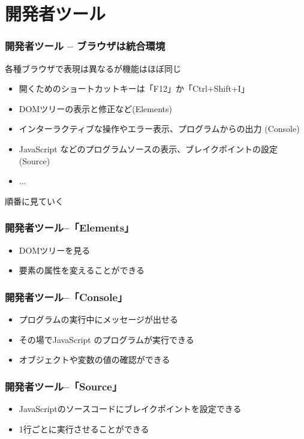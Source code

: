 \section{開発者ツール}
\begin{frame}[containsverbatim]
 \frametitle{開発者ツール -- ブラウザは統合環境}
 各種ブラウザで表現は異なるが機能はほぼ同じ
 \begin{itemize}
  \item 開くためのショートカットキーは「F12」か「Ctrl+Shift+I」
  \item DOMツリーの表示と修正など(Elements)
  \item インターラクティブな操作やエラー表示、プログラムからの出力
        (Console)
  \item JavaScript などのプログラムソースの表示、ブレイクポイントの設定
        (Source)
  \item ...
 \end{itemize}
 順番に見ていく
\end{frame}
\begin{frame}
 \frametitle{開発者ツール--「Elements」}
 \begin{itemize}
	\item DOMツリーを見る
	\item 要素の属性を変えることができる
 \end{itemize}
\end{frame}
\begin{frame}
 \frametitle{開発者ツール--「Console」}
 \begin{itemize}
	\item プログラムの実行中にメッセージが出せる
	\item その場でJavaScript のプログラムが実行できる
	\item オブジェクトや変数の値の確認ができる
 \end{itemize}
\end{frame}
\begin{frame}
 \frametitle{開発者ツール--「Source」}
 \begin{itemize}
	\item JavaScriptのソースコードにブレイクポイントを設定できる
	\item 1行ごとに実行させることができる
 \end{itemize}
\end{frame}
